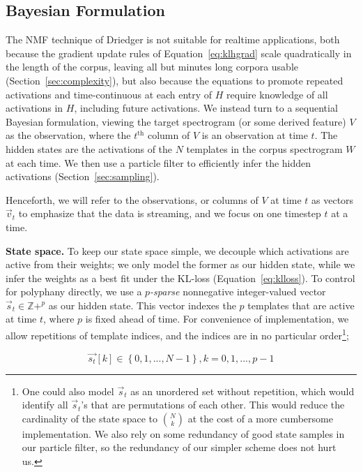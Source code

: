 \documentclass{article}
\begin{document}
\subsection{Bayesian Formulation}
\label{sec:bayesian}

    The NMF technique of Driedger is not suitable for realtime applications, both because the gradient update rules of Equation~\ref{eq:klhgrad} scale quadratically in the length of the corpus, leaving all but minutes long corpora usable (Section~\ref{sec:complexity}), but also because the equations to promote repeated activations and time-continuous at each entry of $H$ require knowledge of all activations in $H$, including future activations.  We instead turn to a sequential Bayesian formulation, viewing the target spectrogram (or some derived feature) $V$ as the observation, where the $t^{\text{th}}$ column of $V$ is an observation at time $t$.  The hidden states are the activations of the $N$ templates in the corpus spectrogram $W$ at each time.  We then use a particle filter to efficiently infer the hidden activations (Section~\ref{sec:sampling}).
    
    Henceforth, we will refer to the observations, or columns of $V$ at time $t$ as vectors $\vec{v}_t$ to emphasize that the data is streaming, and we focus on one timestep $t$ at a time.  
    
    \textbf{State space.} To keep our state space simple, we decouple which activations are active from their weights; we only model the former as our hidden state, while we infer the weights as a best fit under the KL-loss (Equation~\ref{eq:klloss}).  To control for polyphany directly, we use a {\em $p$-sparse} nonnegative integer-valued vector $\vec{s}_t \in \mathbb{Z}+^p$ as our hidden state.  This vector indexes the $p$ templates that are active at time $t$, where $p$ is fixed ahead of time.  For convenience of implementation, we allow repetitions of template indices, and the indices are in no particular order\footnote{One could also model $\vec{s}_t$ as an unordered set without repetition, which would identify all $\vec{s}_t$'s that are permutations of each other.  This would reduce the cardinality of the state space to $\binom{N}{k}$ at the cost of a more cumbersome implementation.  We also rely on some redundancy of good state samples in our particle filter, so the redundancy of our simpler scheme does not hurt us.};

    \begin{equation} 
        \label{eq:statevector}
        \vec{s_t}[k] \in \left\{0, 1, ..., N-1\right\}, k = 0, 1, ..., p-1 
    \end{equation}
\end{document}
